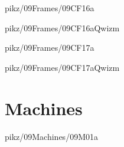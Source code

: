 \documentclass[9pt,xcolor={svgnames, x11names}]{beamer}
\begin{document}

\begin{frame}{pikz/09Frames/09CF16a}
  
\end{frame}


\begin{frame}{pikz/09Frames/09CF16aQwizm}
  
\end{frame}


\begin{frame}{pikz/09Frames/09CF17a}
  
\end{frame}


\begin{frame}{pikz/09Frames/09CF17aQwizm}
  
\end{frame}



\section{Machines}



\begin{frame}{pikz/09Machines/09M01a}
  
\end{frame}



\end{document}

